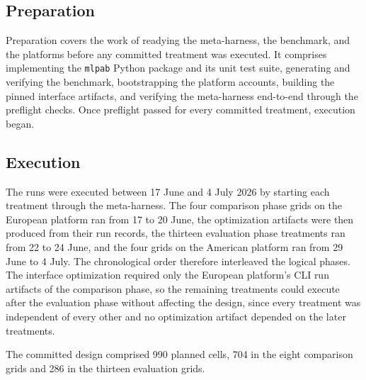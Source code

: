 \documentclass[
english,                 %
bibtex,                  %
]{kththesis}
\newcommand*{\plannedRunCount}{990}
\newcommand*{\plannedComparisonCount}{704}
\newcommand*{\retainedOptimizationCount}{286}
\numberwithin{listing}{chapter}
\begin{document}
\subsection{Preparation}
\label{sec:method_preparation}
\glsresetall

Preparation covers the work of readying the meta-harness, the benchmark, and the platforms before any committed treatment was executed. It comprises implementing the \texttt{mlpab} Python package and its unit test suite, generating and verifying the benchmark, bootstrapping the platform accounts, building the pinned interface artifacts, and verifying the meta-harness end-to-end through the preflight checks. Once preflight passed for every committed treatment, execution began.

\subsection{Execution}
\label{sec:method_execution}
\glsresetall

The runs were executed between 17 June and 4 July 2026 by starting each treatment through the meta-harness. The four comparison phase grids on the European platform ran from 17 to 20 June, the optimization artifacts were then produced from their run records, the thirteen evaluation phase treatments ran from 22 to 24 June, and the four grids on the American platform ran from 29 June to 4 July. The chronological order therefore interleaved the logical phases. The interface optimization required only the European platform's \gls{CLI} run artifacts of the comparison phase, so the remaining treatments could execute after the evaluation phase without affecting the design, since every treatment was independent of every other and no optimization artifact depended on the later treatments.

The committed design comprised \plannedRunCount{} planned cells, \plannedComparisonCount{} in the eight comparison grids and \retainedOptimizationCount{} in the thirteen evaluation grids.
\end{document}
